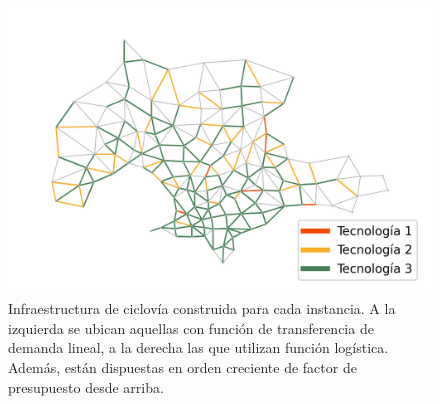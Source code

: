 \begin{figure}[h!]
  \includegraphics[width=.49\linewidth]{../resources/montevideo_d3000.0_inv_logit_1.6_budget_factor.png}
  \caption{Infraestructura de ciclovía construida para cada instancia. A la izquierda se ubican aquellas con función de transferencia de demanda lineal, a la derecha las que utilizan función logística. Además, están dispuestas en orden creciente de factor de presupuesto desde arriba.}
  \label{fig:montevideo_instances_infras}
\end{figure}

